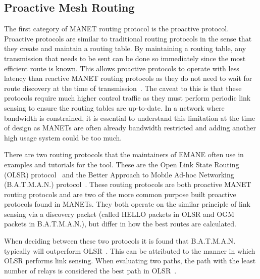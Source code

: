 \subsection{Proactive Mesh Routing}
The first category of MANET routing protocol is the proactive protocol.
Proactive protocols are similar to traditional routing protocols in the sense that they create and maintain a routing table.
By maintaining a routing table, any transmission that needs to be sent can be done so immediately since the most efficient route is known.
This allows proactive protocols to operate with less latency than reactive MANET routing protocols as they do not need to wait for route discovery at the time of transmission~\cite{manet_performance}.
The caveat to this is that these protocols require much higher control traffic as they must perform periodic link sensing to ensure the routing tables are up-to-date.
In a network where bandwidth is constrained, it is essential to understand this limitation at the time of design as MANETs are often already bandwidth restricted and adding another high usage system could be too much.\par
There are two routing protocols that the maintainers of EMANE often use in examples and tutorials for the tool.
These are the Open Link State Routing (OLSR) protocol~\cite{rfc_olsr} and the Better Approach to Mobile Ad-hoc Networking (B.A.T.M.A.N.) protocol~\cite{batman}. 
These routing protocols are both proactive MANET routing protocols and are two of the more common purpose built proactive protocols found in MANETs.
They both operate on the similar principle of link sensing via a discovery packet (called HELLO packets in OLSR and OGM packets in B.A.T.M.A.N.), but differ in how the best routes are calculated.\par
When deciding between these two protocols it is found that B.A.T.M.A.N. typically will outperform OLSR~\cite{olsrd_batman}.
This can be attributed to the manner in which OLSR performs link sensing.
When evaluating two paths, the path with the least number of relays is considered the best path in OLSR~\cite{rfc_olsr}.
